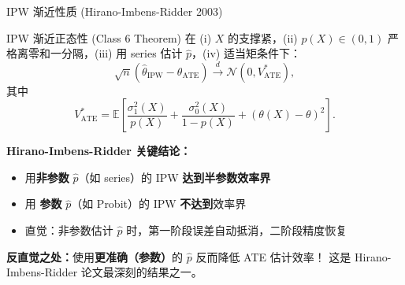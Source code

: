 \documentclass[aspectratio=169, 10pt]{beamer}
\begin{document}
\begin{frame}{IPW 渐近性质 (Hirano-Imbens-Ridder 2003)}

  \begin{definitionbox}{{IPW 渐近正态性 (Class 6 Theorem)}}
    在 (i) $X$ 的支撑紧，(ii) $p(X) \in (0, 1)$ 严格离零和一分隔，(iii) 用 series
    估计 $\hat p$，(iv) 适当矩条件下：
    $$\sqrt{n}(\hat\theta_{\text{IPW}} - \theta_{\text{ATE}}) \overset{d}{\to}
    \mathcal{N}(0, V^{*}_{\text{ATE}}),$$
    其中
    $$V^{*}_{\text{ATE}} = \mathbb{E}\!\left[
    \frac{\sigma_1^2(X)}{p(X)} + \frac{\sigma_0^2(X)}{1 - p(X)} + (\theta(X) - \theta)^2\right].$$
  \end{definitionbox}

  \begin{highlightbox}
    \textbf{Hirano-Imbens-Ridder 关键结论：}
    \begin{itemize}\setlength{\itemsep}{1pt}
      \item 用\textbf{非参数} $\hat p$（如 series）的 IPW \textbf{达到半参数效率界}
      \item 用 \textbf{参数} $\hat p$（如 Probit）的 IPW \textbf{不达到}效率界
      \item 直觉：非参数估计 $\hat p$ 时，第一阶段误差自动抵消，二阶段精度恢复
    \end{itemize}
  \end{highlightbox}

  \begin{keybox}
    \textbf{反直觉之处：}使用\textbf{更准确（参数）}的 $\hat p$ 反而降低 ATE 估计效率！
    这是 Hirano-Imbens-Ridder 论文最深刻的结果之一。
  \end{keybox}

\end{frame}
\end{document}
